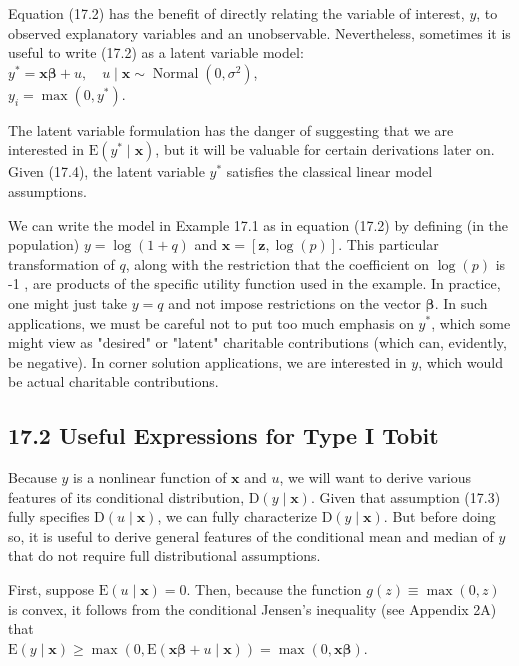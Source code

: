 \documentclass[10pt]{article}
\begin{document}
Equation (17.2) has the benefit of directly relating the variable of interest, $y$, to observed explanatory variables and an unobservable. Nevertheless, sometimes it is useful to write (17.2) as a latent variable model:\\
$y^{*}=\mathbf{x} \boldsymbol{\beta}+u, \quad u \mid \mathbf{x} \sim \operatorname{Normal}\left(0, \sigma^{2}\right)$,\\
$y_{i}=\max \left(0, y^{*}\right)$.

The latent variable formulation has the danger of suggesting that we are interested in $\mathrm{E}\left(y^{*} \mid \mathbf{x}\right)$, but it will be valuable for certain derivations later on. Given (17.4), the latent variable $y^{*}$ satisfies the classical linear model assumptions.

We can write the model in Example 17.1 as in equation (17.2) by defining (in the population) $y=\log (1+q)$ and $\mathbf{x}=[\mathbf{z}, \log (p)]$. This particular transformation of $q$, along with the restriction that the coefficient on $\log (p)$ is -1 , are products of the specific utility function used in the example. In practice, one might just take $y=q$ and not impose restrictions on the vector $\boldsymbol{\beta}$. In such applications, we must be careful not to put too much emphasis on $y^{*}$, which some might view as "desired" or "latent" charitable contributions (which can, evidently, be negative). In corner solution applications, we are interested in $y$, which would be actual charitable contributions.

\subsection*{17.2 Useful Expressions for Type I Tobit}
Because $y$ is a nonlinear function of $\mathbf{x}$ and $u$, we will want to derive various features of its conditional distribution, $\mathrm{D}(y \mid \mathbf{x})$. Given that assumption (17.3) fully specifies $\mathrm{D}(u \mid \mathbf{x})$, we can fully characterize $\mathrm{D}(y \mid \mathbf{x})$. But before doing so, it is useful to derive general features of the conditional mean and median of $y$ that do not require full distributional assumptions.

First, suppose $\mathrm{E}(u \mid \mathbf{x})=0$. Then, because the function $g(z) \equiv \max (0, z)$ is convex, it follows from the conditional Jensen's inequality (see Appendix 2A) that\\
$\mathrm{E}(y \mid \mathbf{x}) \geq \max (0, \mathrm{E}(\mathbf{x} \boldsymbol{\beta}+u \mid \mathbf{x}))=\max (0, \mathbf{x} \boldsymbol{\beta})$.
\end{document}
